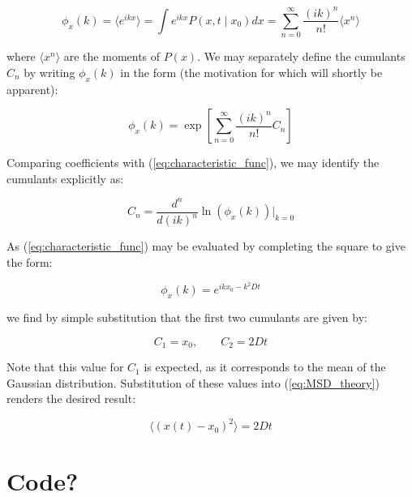 \documentclass[11pt, a4paper]{article} %
\providecommand{\DIFdelbegin}{} %
\providecommand{\DIFdelend}{} %
\begin{document}
\begin{appendices}
\begin{equation} \label{eq:characteristic_func}
\phi_{x}(k) = \langle e^{ikx} \rangle = \int e^{ikx} P(x,t \mid x_{0}) dx = \sum_{n=0}^{\infty} \frac{(ik)^{n}}{n!}\langle x^{n} \rangle
\end{equation}

where $\langle x^{n} \rangle$ are the moments of $P(x)$. We may separately define the cumulants $C_{n}$ by writing $\phi_{x}(k)$ in the form (the motivation for which will shortly be apparent):

\begin{equation}
\phi_{x}(k) =  \exp \left[\sum_{n=0}^{\infty} \frac{(ik)^{n}}{n!} C_{n}  \right]
\end{equation}

Comparing coefficients with (\ref{eq:characteristic_func}), we may identify the cumulants explicitly as:

\begin{equation}
C_{n} = \frac{d^{n}}{d(ik)^{n}} \ln \left(\phi_{x}(k) \right) \biggr|_{k=0} 
\end{equation}

As (\ref{eq:characteristic_func}) may be evaluated by completing the square to give the form:

\begin{equation}
\phi_{x}(k) = e^{ikx_{0} - k^{2}Dt}
\end{equation}

we find by simple substitution that the first two cumulants are given by:

\begin{equation}
C_{1} = x_{0}, \qquad C_{2} = 2Dt
\end{equation}

Note that this value for $C_{1}$ is expected, as it corresponds to the mean of the Gaussian distribution. Substitution of these values into (\ref{eq:MSD_theory}) renders the desired result:

\begin{equation}
\langle (x(t) - x_{0})^{2} \rangle = 2Dt
\end{equation}
\DIFdelbegin %

\DIFdelend \section{Code?}

\end{appendices}
\end{document}
